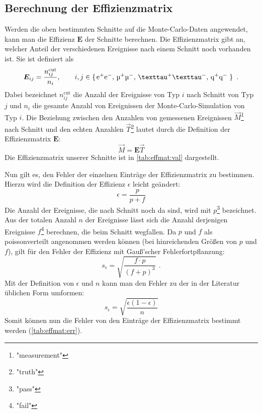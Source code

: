 \subsection{Berechnung der Effizienzmatrix}
Werden die oben bestimmten Schnitte auf die Monte-Carlo-Daten angewendet, kann man die Effizienz $\bm{E}$ der Schnitte berechnen.
Die Effizienzmatrix gibt an, welcher Anteil der verschiedenen Ereignisse nach einem Schnitt noch vorhanden ist. Sie ist definiert als
\begin{equation}
    \bm{E}_{ij} = \frac{n_{ij}^\text{cut}}{n_i}, \qquad \text{$i, j \in \left\{\right.$e$^+$e$^-$, \textmu$^+$\textmu$^-$, \texttau$^+$\texttau$^-$, q$^+$q$^-\left.\right\}$} \ \, .
\end{equation}
Dabei bezeichnet $n_{ij}^\text{cut}$ die Anzahl der Ereignisse von Typ $i$ nach Schnitt von Typ $j$ und $n_i$ die gesamte Anzahl von Ereignissen
der Monte-Carlo-Simulation von Typ $i$.
Die Beziehung zwischen den Anzahlen von gemessenen Ereignissen $\vec{M}$\footnote{"measurement"} nach Schnitt und den echten Anzahlen
$\vec{T}$\footnote{"truth"} lautet durch die Definition der Effizienzmatrix $\bm{E}$:
\begin{equation}
    \label{eq:effmat:mtrel}
    \vec{M} = \bm{E} \vec{T}
\end{equation}
Die Effizienzmatrix unserer Schnitte ist in \autoref{tab:effmat:val} dargestellt.

Nun gilt es, den Fehler der einzelnen Einträge der Effizienzmatrix zu bestimmen. Hierzu wird die Definition der Effizienz $\epsilon$ leicht geändert:
\begin{equation}
    \epsilon = \frac{p}{p+f}
\end{equation}
Die Anzahl der Ereignisse, die nach Schnitt noch da sind, wird mit $p$\footnote{"pass"} bezeichnet. Aus der totalen Anzahl $n$ der Ereignisse lässt
sich die Anzahl derjenigen Ereignisse $f$\footnote{"fail"} berechnen, die beim Schnitt wegfallen. Da $p$ und $f$ als poissonverteilt angenommen
werden können (bei hinreichenden Größen von $p$ und $f$), gilt für den Fehler der Effizienz mit Gauß'scher Fehlerfortpflanzung:
\begin{equation}
    s_\epsilon = \sqrt{\frac{f \cdot p}{ \left( f + p \right)^3}} \ \, .
\end{equation}
Mit der Definition von $\epsilon$ und $n$ kann man den Fehler zu der in der Literatur üblichen Form umformen:
\begin{equation}
    s_\epsilon = \sqrt{\frac{\epsilon (1-\epsilon)}{n}}
\end{equation}
Somit können nun die Fehler von den Einträge der Effizienzmatrix bestimmt werden (\autoref{tab:effmat:err}).

